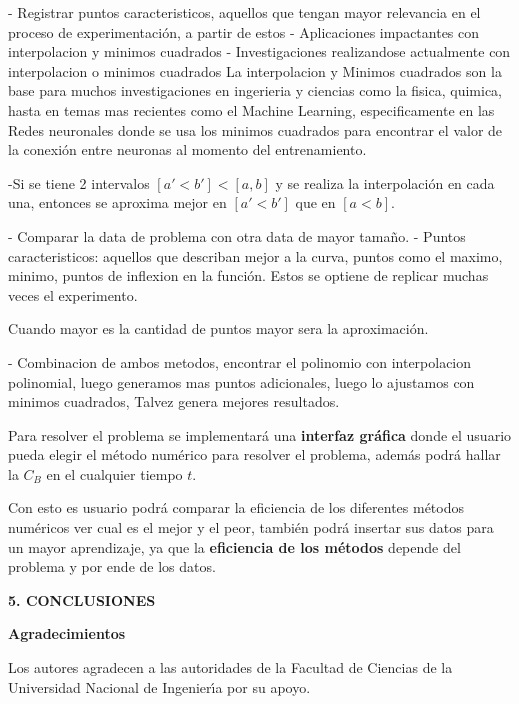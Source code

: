 \documentclass[10pt,a4paper]{article}
\begin{document}
\begin{multicols}{2}
		- Registrar puntos caracteristicos, aquellos que tengan mayor relevancia en el proceso de experimentación, a partir de estos 
		- Aplicaciones impactantes con interpolacion y minimos cuadrados 
		- Investigaciones realizandose actualmente con interpolacion o minimos cuadrados
		La interpolacion y Minimos cuadrados son la base para muchos investigaciones en ingerieria y ciencias como la fisica, quimica, hasta en temas mas recientes como el Machine Learning, especificamente en las Redes neuronales donde se usa los minimos cuadrados para encontrar el valor de la conexión entre neuronas al momento del entrenamiento.
		
		
		-Si se tiene 2 intervalos $[a' < b'] < [a , b] $ y se realiza la interpolación en cada una, entonces se aproxima mejor en $[a'< b']$ que en $[a < b]$.
		
		- Comparar la data de problema con otra data de mayor tamaño.
		- Puntos caracteristicos: aquellos que describan mejor a la curva, puntos como el maximo, minimo, puntos de inflexion en la función. Estos se optiene de replicar muchas veces el experimento.
		
		Cuando mayor es la cantidad de puntos mayor sera la aproximación.
		
		- Combinacion de ambos metodos, encontrar el polinomio con interpolacion polinomial, luego generamos mas puntos adicionales, luego lo ajustamos con minimos cuadrados, Talvez genera mejores resultados.
		
			
		\noindent Para resolver el problema se implementará una \textbf{interfaz gráfica} donde el usuario pueda elegir el método numérico para resolver el problema, además podrá hallar la $C_B$ en el cualquier tiempo $t$.  
		
		\noindent Con esto es usuario podrá comparar la eficiencia de los diferentes métodos numéricos ver cual es el mejor y el peor, también podrá insertar sus datos para un mayor aprendizaje, ya que la \textbf{eficiencia de los métodos} depende del problema y por ende de los datos.
		
		\begin{center}
			{\large \bf 5. CONCLUSIONES}
		\end{center}
		
		\begin{center}
			{\large \bf Agradecimientos}
		\end{center}
		Los autores agradecen a las autoridades de la Facultad de Ciencias de la Universidad Nacional de 
		Ingenier\'{\i}a por su apoyo.
		
	\end{multicols}
	\newpage
	
\end{document}
